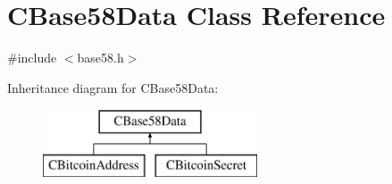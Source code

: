 \hypertarget{class_c_base58_data}{}\section{C\+Base58\+Data Class Reference}
\label{class_c_base58_data}


{\ttfamily \#include $<$base58.\+h$>$}

Inheritance diagram for C\+Base58\+Data\+:\begin{figure}[H]
\begin{center}
\leavevmode
\includegraphics[height=2.000000cm]{class_c_base58_data}
\end{center}
\end{figure}
